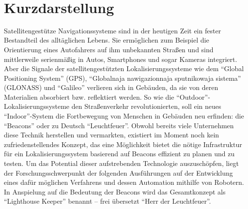 \maketitle 
\newpage\thispagestyle{empty}~
\newpage
\setcounter{tocdepth}{2}

\chapter*{Kurzdarstellung}
Satellitengestütze Navigationssysteme sind in der heutigen Zeit ein fester Bestandteil des alltäglichen Lebens. Sie ermöglichen zum Beispiel die Orientierung eines Autofahrers auf ihm unbekannten Straßen und sind mittlerweile serienmäßig in Autos, Smartphones und sogar Kameras integriert. Aber die Signale der satellitengestützten Lokalisierungssysteme wie dem "`Global Positioning System"' (GPS), "`Globalnaja nawigazionnaja sputnikowaja sistema"' (GLONASS) und "`Galileo"' verlieren sich in Gebäuden, da sie von deren Materialien absorbiert bzw. reflektiert werden. So wie die "`Outdoor"'-Lokalisierungssysteme den Straßenverkehr revolutionierten, soll ein neues "`Indoor"'-System die Fortbewegung von Menschen in Gebäuden neu erfinden: die "`Beacons"' oder zu Deutsch "`Leuchtfeuer"'. Obwohl bereits viele Unternehmen diese Technik herstellen und vermarkten, existiert im Moment noch kein zufriedenstellendes Konzept, das eine Möglichkeit bietet die nötige Infrastruktur für ein Lokalisierungssystem basierend auf Beacons effizient zu planen und zu testen. Um das Potential dieser aufstrebenden Technologie auszuschöpfen, liegt der Forschungsschwerpunkt der folgenden Ausführungen auf der Entwicklung eines dafür möglichen Verfahrens und dessen Automation mithilfe von Robotern. In Anspielung auf die Bedeutung der Beacons wird das Gesamtkonzept als "`Lighthouse Keeper"' benannt -- frei übersetzt "`Herr der Leuchtfeuer"'.